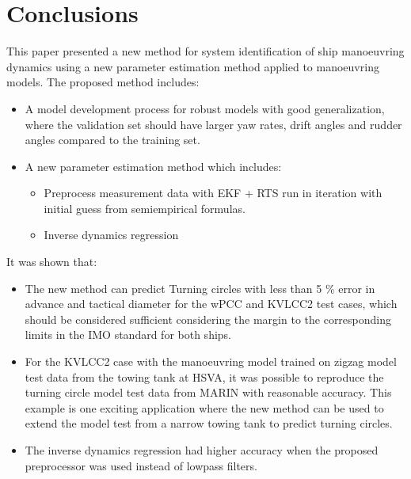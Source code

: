 \documentclass[review]{elsarticle}
\begin{document}
\section{Conclusions}
\label{\detokenize{10.01_conclusions:conclusions}}\label{\detokenize{10.01_conclusions:id1}}\label{\detokenize{10.01_conclusions::doc}}
\sphinxAtStartPar
This paper presented a new method for system identification of ship manoeuvring dynamics using a new parameter estimation method  applied to manoeuvring models. The proposed method includes:
\begin{itemize}
\item {} 
\sphinxAtStartPar
A model development process for robust models with good generalization, where the validation set should have larger yaw rates, drift angles and rudder angles compared to the training set.

\item {} 
\sphinxAtStartPar
A new parameter estimation method which includes:
\begin{itemize}
\item {} 
\sphinxAtStartPar
Preprocess measurement data with EKF + RTS run in iteration with initial guess from semi\sphinxhyphen{}empirical formulas.

\item {} 
\sphinxAtStartPar
Inverse dynamics regression

\end{itemize}

\end{itemize}

\sphinxAtStartPar
It was shown that:
\begin{itemize}
\item {} 
\sphinxAtStartPar
The new method can predict Turning circles with less than 5 \% error in advance and tactical diameter for the wPCC and KVLCC2 test cases, which should be considered sufficient considering the margin to the corresponding limits in the IMO standard for both ships.

\item {} 
\sphinxAtStartPar
For the KVLCC2 case with the manoeuvring model trained on zigzag model test data from the towing tank at HSVA, it was possible to reproduce the turning circle model test data from MARIN with reasonable accuracy. This example is one exciting application where the new method can be used to extend the model test from a narrow towing tank to predict turning circles.

\item {} 
\sphinxAtStartPar
The inverse dynamics regression had higher accuracy when the proposed preprocessor was used instead of low\sphinxhyphen{}pass filters.

\end{itemize}
\end{document}
